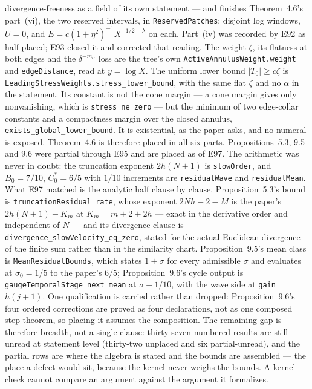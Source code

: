 \documentclass[11pt]{article}
\theoremstyle{plain}
\theoremstyle{definition}
\theoremstyle{remark}
\begin{document}
divergence-freeness as a field of its own statement --- and finishes Theorem~4.6's
part~(vi), the two reserved intervals, in \texttt{ReservedPatches}: disjoint log
windows, $U=0$, and $E = c(1+\eta^2)^{-1}X^{-1/2-\lambda}$ on each. Part~(iv) was recorded by E92 as half placed; E93 closed it and corrected that
reading. The weight $\zeta$, its flatness at both edges and the $\delta^{-m_\alpha}$
loss are the tree's own \texttt{ActiveAnnulusWeight.weight} and \texttt{edgeDistance},
read at $y=\log X$. The uniform lower bound $|T_0| \ge c\zeta$ is
\texttt{LeadingStressWeights.stress\_lower\_bound}, with the same flat $\zeta$ and no
$\alpha$ in the statement. Its constant is not the cone margin --- a cone margin gives
only nonvanishing, which is \texttt{stress\_ne\_zero} --- but the minimum of two
edge-collar constants and a compactness margin over the closed annulus,
\texttt{exists\_global\_lower\_bound}. It is existential, as the paper asks, and no
numeral is exposed. Theorem~4.6 is therefore placed in all six parts.
Propositions~5.3, 9.5 and 9.6 were partial through E95 and are placed as of E97.
The arithmetic was never in doubt: the truncation exponent $2h(N+1)$ is
\texttt{slowOrder}, and $B_0 = 7/10$, $C^*_0 = 6/5$ with $1/10$ increments are
\texttt{residualWave} and \texttt{residualMean}. What E97 matched is the analytic
half clause by clause. Proposition~5.3's bound is
\texttt{truncationResidual\_rate}, whose exponent $2Nh-2-M$ is the paper's
$2h(N+1)-K_m$ at $K_m=m+2+2h$ --- exact in the derivative order and independent
of $N$ --- and its divergence clause is
\texttt{divergence\_slowVelocity\_eq\_zero}, stated for the actual Euclidean
divergence of the finite sum rather than in the similarity chart. Proposition~9.5's
mean class is \texttt{MeanResidualBounds}, which states $1+\sigma$ for every
admissible $\sigma$ and evaluates at $\sigma_0=1/5$ to the paper's $6/5$;
Proposition~9.6's cycle output is \texttt{gaugeTemporalStage\_next\_mean} at
$\sigma+1/10$, with the wave side at \texttt{gain} $h(j+1)$. One qualification is
carried rather than dropped: Proposition~9.6's four ordered corrections are proved
as four declarations, not as one composed step theorem, so placing it assumes the
composition.
The remaining gap is therefore breadth, not a single clause: thirty-seven numbered results are still unread at statement level (thirty-two unplaced and six partial-unread), and the partial rows are where the algebra is stated and the bounds are assembled --- the place a defect would sit, because the kernel never weighs the bounds. A kernel check cannot compare an argument against the argument it formalizes.
\end{document}
